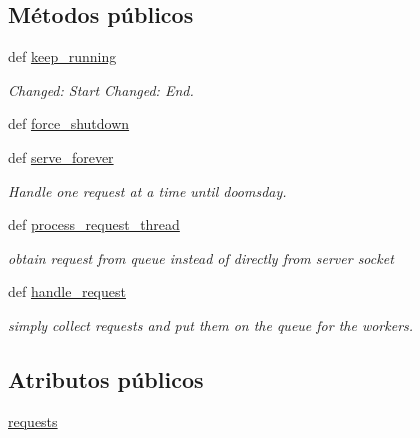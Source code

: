 \subsection*{Métodos públicos}
\begin{DoxyCompactItemize}
\item 
def \hyperlink{class_thread_pool_1_1_thread_pool_mix_in_aca5cd6b9a97351bc88b58a94b55d5bf8}{keep\-\_\-running}
\begin{DoxyCompactList}\small\item\em Changed\-: Start Changed\-: End. \end{DoxyCompactList}\item 
def \hyperlink{class_thread_pool_1_1_thread_pool_mix_in_a52ba9961e4dba0d2151dfc9bb1109c05}{force\-\_\-shutdown}
\item 
def \hyperlink{class_thread_pool_1_1_thread_pool_mix_in_ab81f98e7bd32d246c065f9d4da78e1cb}{serve\-\_\-forever}
\begin{DoxyCompactList}\small\item\em Handle one request at a time until doomsday. \end{DoxyCompactList}\item 
def \hyperlink{class_thread_pool_1_1_thread_pool_mix_in_a3967a11cc2a1ec6cf6d44368ac90ed42}{process\-\_\-request\-\_\-thread}
\begin{DoxyCompactList}\small\item\em obtain request from queue instead of directly from server socket \end{DoxyCompactList}\item 
def \hyperlink{class_thread_pool_1_1_thread_pool_mix_in_af2edfa9a820be9f947c90b737743dea4}{handle\-\_\-request}
\begin{DoxyCompactList}\small\item\em simply collect requests and put them on the queue for the workers. \end{DoxyCompactList}\end{DoxyCompactItemize}
\subsection*{Atributos públicos}
\begin{DoxyCompactItemize}
\item 
\hyperlink{class_thread_pool_1_1_thread_pool_mix_in_a93c8c7dd5f32ba5faa17096ea56070ad}{requests}
\end{DoxyCompactItemize}
